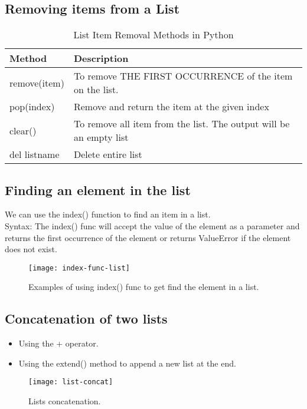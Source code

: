 \subsection{Removing items from a List}
\begin{table}[h!]
	\centering
	\begin{tabularx}{\textwidth}{|l|X|}
		\hline
		Method & Description \\
		\hline
		remove(item) & To remove THE FIRST OCCURRENCE of the item on the list. \\
		\hline
		pop(index) & Remove and return the item at the given index \\
		\hline
		clear() & To remove all item from the list. The output will be an empty list \\
		\hline
		del listname & Delete entire list \\
		\hline
\end{tabularx}
\caption{List Item Removal Methods in Python}
\label{tab:list-removal}
\end{table}

\subsection{Finding an element in the list}
We can use the index() function to find an item in a list. \\ [0.5em]
{\large Syntax:} The index() func will accept the value of the element as a parameter and returns the first occurrence of the element or returns ValueError if the element does not exist. 

\begin{figure}[h]
	\centering
	\texttt{[image: index-func-list]}
	\caption{Examples of using index() func to get find the element in a list.}
	\label{fig:index-func}
\end{figure}

\subsection{Concatenation of two lists}
\begin{itemize}
	\item Using the + operator.
	\item Using the extend() method to append a new list at the end.
\end{itemize}

\begin{figure}[h]
	\centering
	\texttt{[image: list-concat]}
	\caption{Lists concatenation.}
	\label{fig:list-concat}
\end{figure}

